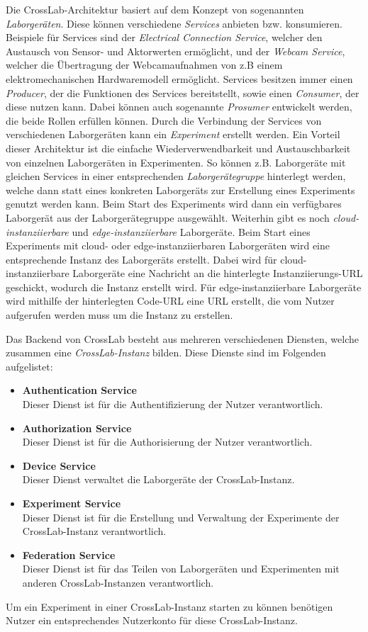 Die CrossLab-Architektur basiert auf dem Konzept von sogenannten \textit{Laborgeräten}. Diese können verschiedene \textit{Services} anbieten bzw. konsumieren. Beispiele für Services sind der \textit{Electrical Connection Service}, welcher den Austausch von Sensor- und Aktorwerten ermöglicht, und der \textit{Webcam Service}, welcher die Übertragung der Webcamaufnahmen von z.B einem elektromechanischen Hardwaremodell ermöglicht. Services besitzen immer einen \textit{Producer}, der die Funktionen des Services bereitstellt, sowie einen \textit{Consumer}, der diese nutzen kann. Dabei können auch sogenannte \textit{Prosumer} entwickelt werden, die beide Rollen erfüllen können. Durch die Verbindung der Services von verschiedenen Laborgeräten kann ein \textit{Experiment} erstellt werden. Ein Vorteil dieser Architektur ist die einfache Wiederverwendbarkeit und Austauschbarkeit von einzelnen Laborgeräten in Experimenten. So können z.B. Laborgeräte mit gleichen Services in einer entsprechenden \textit{Laborgerätegruppe} hinterlegt werden, welche dann statt eines konkreten Laborgeräts zur Erstellung eines Experiments genutzt werden kann. Beim Start des Experiments wird dann ein verfügbares Laborgerät aus der Laborgerätegruppe ausgewählt. Weiterhin gibt es noch \textit{cloud-instanziierbare} und \textit{edge-instanziierbare} Laborgeräte. Beim Start eines Experiments mit cloud- oder edge-instanziierbaren Laborgeräten wird eine entsprechende Instanz des Laborgeräts erstellt. Dabei wird für cloud-instanziierbare Laborgeräte eine Nachricht an die hinterlegte Instanziierungs-URL geschickt, wodurch die Instanz erstellt wird. Für edge-instanziierbare Laborgeräte wird mithilfe der hinterlegten Code-URL eine URL erstellt, die vom Nutzer aufgerufen werden muss um die Instanz zu erstellen.

Das Backend von CrossLab besteht aus mehreren verschiedenen Diensten, welche zusammen eine \textit{CrossLab-Instanz} bilden. Diese Dienste sind im Folgenden aufgelistet:
\begin{itemize}
    \item \textbf{Authentication Service} \\ Dieser Dienst ist für die Authentifizierung der Nutzer verantwortlich.
    \item \textbf{Authorization Service} \\ Dieser Dienst ist für die Authorisierung der Nutzer verantwortlich.
    \item \textbf{Device Service} \\ Dieser Dienst verwaltet die Laborgeräte der CrossLab-Instanz.
    \item \textbf{Experiment Service} \\ Dieser Dienst ist für die Erstellung und Verwaltung der Experimente der CrossLab-Instanz verantwortlich.
    \item \textbf{Federation Service} \\ Dieser Dienst ist für das Teilen von Laborgeräten und Experimenten mit anderen CrossLab-Instanzen verantwortlich.
\end{itemize}
Um ein Experiment in einer CrossLab-Instanz starten zu können benötigen Nutzer ein entsprechendes Nutzerkonto für diese CrossLab-Instanz.